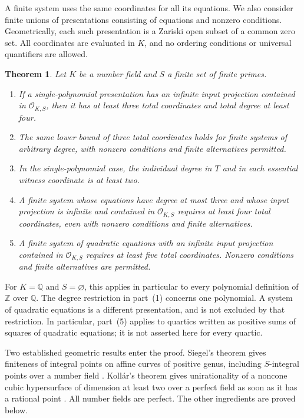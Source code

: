 \documentclass[11pt,a4paper]{article}
\newtheorem{theorem}{Theorem}[section]
\theoremstyle{definition}
\newcommand{\OKS}{\mathcal O_{K,S}}
\begin{document}
A finite system uses the same coordinates for all its equations.
We also consider finite unions of presentations consisting of equations
and nonzero conditions. Geometrically, each such presentation is a
Zariski open subset of a common zero set. All coordinates are evaluated
in $K$, and no ordering conditions or universal quantifiers are allowed.

\begin{samepage}
\begin{theorem}\label{lb:main}
Let $K$ be a number field and $S$ a finite set of finite primes.
\begin{enumerate}
\item If a single-polynomial presentation has an infinite input
projection contained in $\OKS$, then it has at least three total
coordinates and total degree at least four.
\item The same lower bound of three total coordinates holds for
finite systems of arbitrary degree, with nonzero conditions and finite
alternatives permitted.
\item In the single-polynomial case, the individual degree in $T$
and in each essential witness coordinate is at least two.
\item A finite system whose equations have degree at most three
and whose input projection is infinite and contained in $\OKS$
requires at least four total coordinates, even with nonzero
conditions and finite alternatives.
\item A finite system of quadratic equations with an infinite
input projection contained in $\OKS$ requires at least five total
coordinates. Nonzero conditions and finite alternatives are permitted.
\end{enumerate}
\end{theorem}
\end{samepage}

For $K=\mathbb Q$ and $S=\varnothing$, this applies in particular
to every polynomial definition of $\mathbb Z$ over $\mathbb Q$.
The degree restriction in part~(1) concerns one polynomial. A system
of quadratic equations is a different presentation, and is not
excluded by that restriction. In particular, part~(5) applies to
quartics written as positive sums of squares of quadratic equations;
it is not asserted here for every quartic.

Two established geometric results enter the proof. Siegel's theorem
gives finiteness of integral points on affine curves of positive
genus, including $S$-integral points over a number field
\cite[Chapter~8]{Lang}. Koll\'ar's theorem gives unirationality of a
noncone cubic hypersurface of dimension at least two over a perfect
field as soon as it has a rational point \cite[Theorem~2]{Kollar}.
All number fields are perfect. The other ingredients are proved below.
\end{document}

